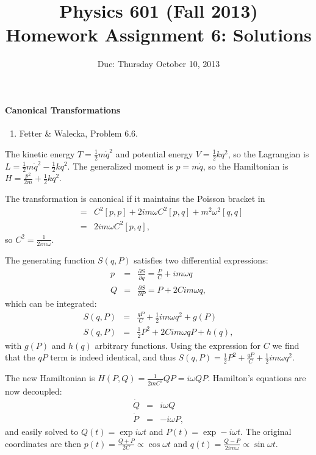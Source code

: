 \documentclass[letterpaper,11pt]{article}
\title{Physics 601 (Fall 2013) \\ Homework Assignment 6: Solutions}
\date{Due: Thursday October 10, 2013}
\begin{document}
\maketitle

\paragraph*{Canonical Transformations}
\begin{enumerate}
 \item Fetter \& Walecka, Problem 6.6.
\end{enumerate}

The kinetic energy $T = \frac{1}{2} m \dot{q}^2$ and potential energy $V = \frac{1}{2} k q^2$, so the Lagrangian is $L = \frac{1}{2} m \dot{q}^2 - \frac{1}{2} k q^2$.  The generalized moment is $p = m \dot{q}$, so the Hamiltonian is $H = \frac{p^2}{2m} + \frac{1}{2} k q^2$.

The transformation is canonical if it maintains the Poisson bracket in
\begin{eqnarray*}
 [P,Q] & = & C^2 [p,p] + 2 im\omega C^2 [p,q] + m^2\omega^2 [q,q] \\
 & = & 2 im\omega C^2 [p,q],
\end{eqnarray*}
so $C^2 = \frac{1}{2 im\omega}$.

The generating function $S(q,P)$ satisfies two differential expressions:
\begin{eqnarray*}
 p & = & \frac{\partial S}{\partial q} = \frac{P}{C} + im\omega q \\
 Q & = & \frac{\partial S}{\partial P} = P + 2 C im\omega q,
\end{eqnarray*}
which can be integrated:
\begin{eqnarray*}
 S(q,P) & = & \frac{q P}{C} + \frac{1}{2}im\omega q^2 + g(P) \\
 S(q,P) & = & \frac{1}{2} P^2 + 2 C im\omega q P + h(q),
\end{eqnarray*}
with $g(P)$ and $h(q)$ arbitrary functions.  Using the expression for $C$ we find that the $q P$ term is indeed identical, and thus $S(q,P) = \frac{1}{2} P^2 + \frac{qP}{C} + \frac{1}{2}im\omega q^2$.

The new Hamiltonian is $H(P,Q) = \frac{1}{2 m C^2} Q P = i\omega Q P$.  Hamilton's equations are now decoupled:
\begin{eqnarray*}
 \dot{Q} & = & i\omega Q \\
 \dot{P} & = & -i\omega P,
\end{eqnarray*}
and easily solved to $Q(t) = \exp i\omega t$ and $P(t) = \exp -i\omega t$.  The original coordinates are then $p(t) = \frac{Q + P}{2 C} \propto \cos\omega t$ and $q(t) = \frac{Q - P}{2 im\omega} \propto \sin\omega t$.
\end{document}
